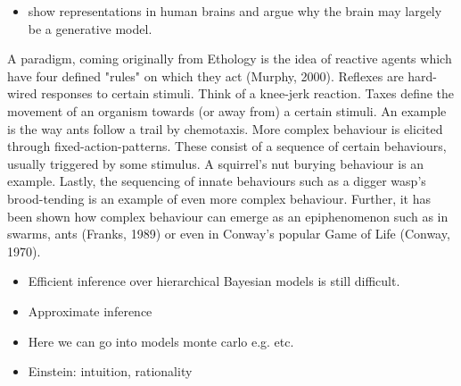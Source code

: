 
\begin{itemize}
    \item show representations in human brains and argue why the brain may largely be a generative model. 
\end{itemize}

A paradigm, coming originally from Ethology is the idea of reactive agents which have four defined "rules" on which they act (Murphy, 2000). Reflexes are hard-wired responses to certain stimuli. Think of a knee-jerk reaction. Taxes
define the movement of an organism towards (or away from) a certain stimuli. An example is the way ants follow a trail by chemotaxis. More complex behaviour is elicited through fixed-action-patterns. These consist of a sequence of certain behaviours, usually triggered by some stimulus. A squirrel's nut burying behaviour is an example. Lastly, the sequencing of innate behaviours such as a digger wasp's brood-tending is an example of even more complex behaviour. Further, it has been shown how complex behaviour can emerge as an epiphenomenon such as in swarms, ants (Franks, 1989) or even in Conway's popular Game of Life (Conway, 1970).



\begin{itemize}
    \item Efficient inference over hierarchical Bayesian models is still difficult.
    \item Approximate inference
    \item Here we can go into models monte carlo e.g. etc.
    \item Einstein: intuition, rationality
\end{itemize}



